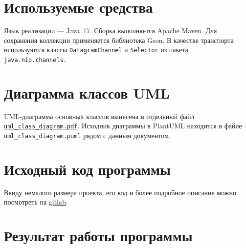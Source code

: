 \documentclass[a4paper,14pt]{extarticle}
\begin{document}
\section{Используемые средства}

Язык реализации --- Java~17. Сборка выполняется Apache Maven. Для сохранения коллекции применяется библиотека Gson. В качестве транспорта используются классы \texttt{DatagramChannel} и \texttt{Selector} из пакета \texttt{java.nio.channels}.

\section{Диаграмма классов UML}

UML-диаграмма основных классов вынесена в отдельный файл \href{uml_class_diagram.pdf}{\texttt{uml\_class\_diagram.pdf}}. Исходник диаграммы в PlantUML находится в файле \texttt{uml\_class\_diagram.puml} рядом с данным документом.

\section{Исходный код программы}

Ввиду немалого размера проекта, его код и более подробное описание можно посмотреть на \href{https://gitlab.se.ifmo.ru/amoruch/programming_lab6}{gitlab}.

\section{Результат работы программы}
\end{document}
